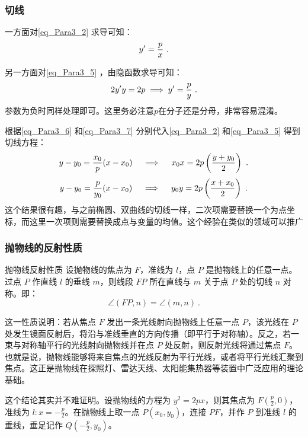 \subsubsection{切线}

一方面对\autoref{eq_Para3_2} 求导可知：
\begin{equation}\label{eq_Para3_6}
y'={p\over x}~.
\end{equation}

另一方面对\autoref{eq_Para3_5} ，由隐函数求导可知：
\begin{equation}\label{eq_Para3_7}
2y'y=2p\implies y'={p\over y}~.
\end{equation}
参数为负时同样处理即可。这里务必注意$p$在分子还是分母，非常容易混淆。

根据\autoref{eq_Para3_6} 和\autoref{eq_Para3_7} 分别代入\autoref{eq_Para3_2} 和\autoref{eq_Para3_5} 得到切线方程：
\begin{equation}
y-y_0={x_0\over p}(x-x_0)\quad\implies\quad x_0x=2p\left(\frac{y+y_0}{2}\right)~.
\end{equation}
\begin{equation}
y-y_0={p\over y_0}(x-x_0)\quad\implies\quad y_0y=2p\left(\frac{x+x_0}{2}\right)~.
\end{equation}
这个结果很有趣，与之前椭圆、双曲线的切线一样，二次项需要替换一个为点坐标，而这里一次项则需要替换成点与变量的均值。这个经验在类似的领域可以推广

\subsubsection{抛物线的反射性质}

\begin{theorem}{抛物线反射性质}
设抛物线的焦点为 $F$，准线为 $l$，点 $P$ 是抛物线上的任意一点。过点 $P$ 作直线 $l$ 的垂线 $m$，则线段 $FP$ 所在直线与 $m$ 关于点 $P$ 处的切线 $n$ 对称。即：
\begin{equation}
\angle(FP, n) = \angle(m, n)~.
\end{equation}
\end{theorem}

这一性质说明：若从焦点 $F$ 发出一条光线射向抛物线上任意一点 $P$，该光线在 $P$ 处发生镜面反射后，将沿与准线垂直的方向传播（即平行于对称轴）。反之，若一束与对称轴平行的光线射向抛物线并在点 $P$ 处反射，则反射光线将通过焦点 $F$。也就是说，抛物线能够将来自焦点的光线反射为平行光线，或者将平行光线汇聚到焦点。这正是抛物线在探照灯、雷达天线、太阳能集热器等装置中广泛应用的理论基础。

这个结论其实并不难证明。设抛物线的方程为 $y^2 = 2px$，则其焦点为 $\displaystyle F\left(\frac{p}{2}, 0\right)$，准线为 $\displaystyle l: x = -\frac{p}{2}$。在抛物线上取一点 $P(x_0, y_0)$，连接 $PF$，并作 $P$ 到准线 $l$ 的垂线，垂足记作 $Q\left( \displaystyle -\frac{p}{2}, y_0 \right)$。


